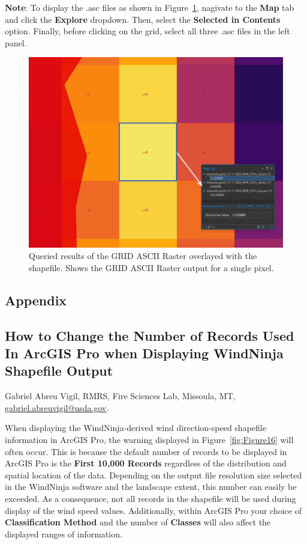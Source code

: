 \documentclass[12pt]{article}
\begin{document}
\textbf{Note}: To display the .asc files as shown in Figure~\ref{fig:Figure15}, nagivate to the \textbf{Map} tab and click the \textbf{Explore} dropdown. Then, select the \textbf{Selected in Contents} option. Finally, before clicking on the grid, select all three .asc files in the left panel. 

\begin{figure}[H]
	\centering
	\includegraphics[scale=0.4]{arc_15.png}
	\caption{Queried results of the GRID ASCII Raster overlayed with the shapefile. Shows the GRID ASCII Raster output for a single pixel.}
\label{fig:Figure15}
\end{figure}


\renewcommand{\thefigure}{\arabic{figure}}
\setcounter{figure}{0}

\pagebreak
\begin{centering}
\section*{Appendix}
\label{section:appendix}

\subsection*{How to Change the Number of Records Used In ArcGIS Pro when Displaying WindNinja Shapefile Output}
Gabriel Abreu Vigil, RMRS, Fire Sciences Lab, Missoula, MT, \href{mailto:gabriel.abreuvigil@usda.gov}{gabriel.abreuvigil@usda.gov}.
\end{centering}

When displaying the WindNinja-derived wind direction-speed shapefile information in ArcGIS Pro, the warning displayed in Figure~\ref{fig:Figure16} will often occur. This is because the default number of records to be displayed in ArcGIS Pro is the \textbf{First 10,000 Records} regardless of the distribution and spatial location of the data. Depending on the output file resolution size selected in the WindNinja software and the landscape extent, this number can easily be exceeded. As a consequence, not all records in the shapefile will be used during display of the wind speed values. Additionally, within ArcGIS Pro your choice of \textbf{Classification Method} and the number of \textbf{Classes} will also affect the displayed ranges of information.
\end{document}
